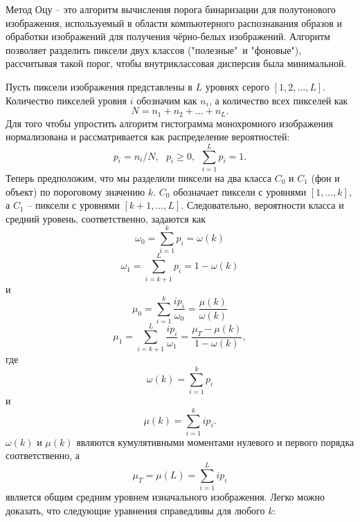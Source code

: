 Метод Оцу -- это алгоритм вычисления порога бинаризации для полутонового
изображения, используемый в области компьютерного распознавания образов
и обработки изображений для получения чёрно-белых изображений. Алгоритм
позволяет разделить пиксели двух классов ("полезные"\ и "фоновые"), 
рассчитывая такой порог, чтобы внутриклассовая дисперсия была
минимальной.

Пусть пиксели изображения представлены в $L$ уровнях серого 
$[1, 2, ..., L]$. Количество пикселей уровня $i$ обозначим как $n_i$, а
количество всех пикселей как $$N = n_1 + n_2 + ... + n_L.$$ Для того
чтобы упростить алгоритм гистограмма монохромного изображения 
нормализована и рассматривается как распределение вероятностей:
\begin{equation}
	p_i=n_i/N,~~~p_i \geq 0,~~\sum_{i=1}^L{p_i}=1.
	\label{probab}
\end{equation}
Теперь предположим, что мы разделили пиксели на два класса $C_0$ и $C_1$ 
(фон и объект) по пороговому значению $k$. $C_0$ обозначает пиксели с
уровнями $[1, ..., k]$, а $C_1$ -- пиксели с уровнями $[k+1, ..., L]$.
Следовательно, вероятности класса и средний уровень, соответственно,
задаются как
\begin{equation}
	\omega_0=\sum^k_{i=1}{p_i}=\omega(k)
	\label{w_0}
\end{equation}
\begin{equation}
	\omega_1=\sum^L_{i=k+1}{p_i}=1-\omega(k)
	\label{w_1}
\end{equation}
и
\begin{equation}
	\mu_0=\sum^k_{i=1}{\frac{ip_i}{\omega_0}}=\frac{\mu(k)}{\omega(k)}
	\label{mu_0}
\end{equation}
\begin{equation}
	\mu_1=\sum^L_{i=k+1}{\frac{ip_i}{\omega_1}}=\frac{\mu_T-\mu(k)}
	{1-\omega(k)},
	\label{mu_1}
\end{equation}
где
\begin{equation}
	\omega(k)=\sum^k_{i=1}{p_i}
	\label{omega_k}
\end{equation}
и
\begin{equation}
	\mu(k)=\sum^k_{i=1}{ip_i}.
	\label{mu_k}
\end{equation}
$\omega(k)$ и $\mu(k)$ являются кумулятивными моментами нулевого и 
первого порядка соответственно, а
\begin{equation}
	\mu_T=\mu(L)=\sum^L_{i=1}{ip_i}
	\label{mu_T}
\end{equation}
является общим средним уровнем изначального изображения. Легко можно
доказать, что следующие уравнения справедливы для любого $k$:
